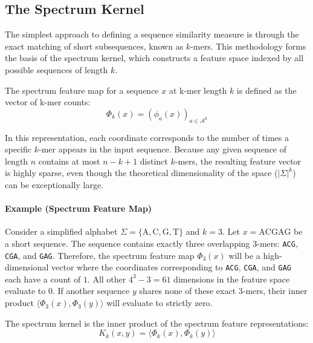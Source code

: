 \subsection{The Spectrum Kernel}\label{sec:spectrum}

The simplest approach to defining a sequence similarity measure is through the exact matching of short subsequences, known as $k$-mers. This methodology forms the basis of the spectrum kernel, which constructs a feature space indexed by all possible sequences of length $k$. 

\begin{definizione}\label{def:spectrum-feature-map}
The spectrum feature map for a sequence $x$ at k-mer length $k$ is defined as the vector of k-mer counts:
\begin{equation}\label{eq:spectrum-feature-map}
\Phi_k(x) = (\phi_a(x))_{a \in \mathcal{A}^k}
\end{equation}
\end{definizione}

In this representation, each coordinate corresponds to the number of times a specific $k$-mer appears in the input sequence. Because any given sequence of length $n$ contains at most $n - k + 1$ distinct $k$-mers, the resulting feature vector is highly sparse, even though the theoretical dimensionality of the space ($|\Sigma|^k$) can be exceptionally large.

\paragraph{Example (Spectrum Feature Map)}
Consider a simplified alphabet $\Sigma = \{\text{A}, \text{C}, \text{G}, \text{T}\}$ and $k=3$. Let $x = \text{ACGAG}$ be a short sequence. 
The sequence contains exactly three overlapping $3$-mers: \texttt{ACG}, \texttt{CGA}, and \texttt{GAG}.
Therefore, the spectrum feature map $\Phi_3(x)$ will be a high-dimensional vector where the coordinates corresponding to \texttt{ACG}, \texttt{CGA}, and \texttt{GAG} each have a count of $1$. All other $4^3 - 3 = 61$ dimensions in the feature space evaluate to $0$. 
If another sequence $y$ shares none of these exact $3$-mers, their inner product $\langle \Phi_3(x), \Phi_3(y) \rangle$ will evaluate to strictly zero.

\begin{definizione}\label{def:spectrum-kernel}
The spectrum kernel is the inner product of the spectrum feature representations:
\begin{equation}\label{eq:spectrum-kernel}
K_k(x, y) = \langle \Phi_k(x), \Phi_k(y) \rangle
\end{equation}
\end{definizione}

